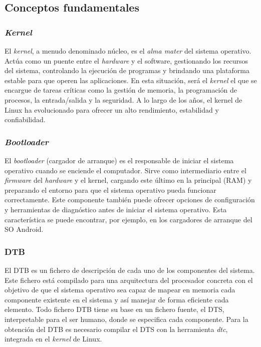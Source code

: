 \subsection{Conceptos fundamentales}
\subsubsection{\textit{Kernel}}
\label{subs:kernel}
El \textit{kernel}, a menudo denominado núcleo, es el \textit{alma mater} del sistema operativo. Actúa como un puente entre el \textit{hardware} y el software, gestionando los recursos del sistema, controlando la ejecución de programas y brindando una plataforma estable para que operen las aplicaciones. En esta situación, será el \textit{kernel} el que se encargue de tareas críticas como la gestión de memoria, la programación de procesos, la entrada/salida y la seguridad. A lo largo de los años, el kernel de Linux ha evolucionado para ofrecer un alto rendimiento, estabilidad y confiabilidad.

\subsubsection{\textit{Bootloader}}
\label{subs:bootloader}
El \textit{bootloader} (cargador de arranque) es el responsable de iniciar el sistema operativo cuando se enciende el computador. Sirve como intermediario entre el \textit{firmware} del \textit{hardware} y el kernel, cargando este último en la principal (RAM) y preparando el entorno para que el sistema operativo pueda funcionar correctamente. Este componente también puede ofrecer opciones de configuración y herramientas de diagnóstico antes de iniciar el sistema operativo. Esta característica se puede encontrar, por ejemplo, en los cargadores de arranque del \ac{SO} Android.

\subsubsection{DTB}
\label{subs:dtb}
El \ac{DTB} es un fichero de descripción de cada uno de los componentes del sistema. Este fichero está compilado para una arquitectura del procesador concreta con el objetivo de que el sistema operativo sea capaz de mapear en memoria cada componente existente en el sistema y así manejar de forma eficiente cada elemento. Todo fichero \ac{DTB} tiene su base en un fichero fuente, el \ac{DTS}, interpretable para el ser humano, donde se especifica cada componente. Para la obtención del \ac{DTB} es necesario compilar el \ac{DTS} con la herramienta \textit{dtc}, integrada en el \textit{kernel} de Linux. 

